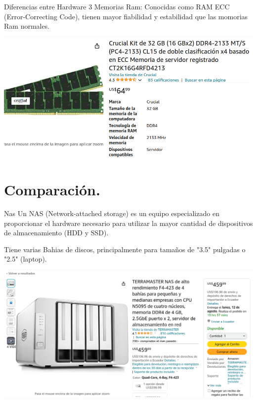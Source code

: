 \documentclass[presentation]{beamer}
\begin{document}
\begin{frame}[label={sec:orga43213d}]{Diferencias entre Hardware 3}
Memorias Ram: Conocidas como RAM ECC (Error-Correcting Code), tienen mayor fiabilidad y estabilidad que las momorias Ram normales.
\begin{center}
\includegraphics[width=.9\linewidth]{./imagenes/RAMserver.png}
\end{center}
\end{frame}

\section{Comparación.}
\label{sec:orgb1df30f}

\begin{frame}[label={sec:orgfe5a98a}]{Nas}
Un NAS (Network-attached storage) es un equipo especializado en proporcionar el hardware necesario para utilizar la mayor cantidad de dispositivos de almacenamiento (HDD y SSD).

Tiene varias Bahias de discos, principalmente para tamaños de "3.5" pulgadas o "2.5" (laptop).

\begin{center}
\includegraphics[width=.9\linewidth]{./imagenes/NAS1.png}
\end{center}
\end{frame}
\end{document}
